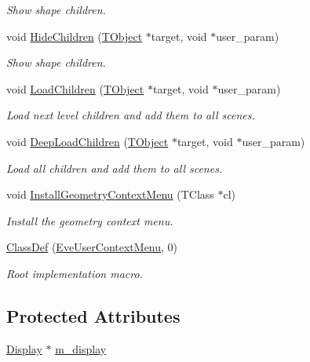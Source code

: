 \begin{DoxyCompactItemize}
\begin{DoxyCompactList}\small\item\em Show shape children. \end{DoxyCompactList}\item 
void \hyperlink{class_d_d4hep_1_1_eve_user_context_menu_a3dd44ef5d2c2a19002a584bb3aa0b10e}{Hide\+Children} (\hyperlink{class_t_object}{T\+Object} $\ast$target, void $\ast$user\+\_\+param)
\begin{DoxyCompactList}\small\item\em Show shape children. \end{DoxyCompactList}\item 
void \hyperlink{class_d_d4hep_1_1_eve_user_context_menu_a79e2490b2f169394ea18c19c3271e195}{Load\+Children} (\hyperlink{class_t_object}{T\+Object} $\ast$target, void $\ast$user\+\_\+param)
\begin{DoxyCompactList}\small\item\em Load next level children and add them to all scenes. \end{DoxyCompactList}\item 
void \hyperlink{class_d_d4hep_1_1_eve_user_context_menu_a10d91b40facd41a45d562d9667767884}{Deep\+Load\+Children} (\hyperlink{class_t_object}{T\+Object} $\ast$target, void $\ast$user\+\_\+param)
\begin{DoxyCompactList}\small\item\em Load all children and add them to all scenes. \end{DoxyCompactList}\item 
void \hyperlink{class_d_d4hep_1_1_eve_user_context_menu_a659b7acc26b0a8812cb688149d44a20d}{Install\+Geometry\+Context\+Menu} (T\+Class $\ast$cl)
\begin{DoxyCompactList}\small\item\em Install the geometry context menu. \end{DoxyCompactList}\item 
\hyperlink{class_d_d4hep_1_1_eve_user_context_menu_a05246cb30938d2a51dbb68468a3e8f8f}{Class\+Def} (\hyperlink{class_d_d4hep_1_1_eve_user_context_menu}{Eve\+User\+Context\+Menu}, 0)
\begin{DoxyCompactList}\small\item\em Root implementation macro. \end{DoxyCompactList}\end{DoxyCompactItemize}
\subsection*{Protected Attributes}
\begin{DoxyCompactItemize}
\item 
\hyperlink{class_d_d4hep_1_1_display}{Display} $\ast$ \hyperlink{class_d_d4hep_1_1_eve_user_context_menu_ab3592e822e14b2d25c4f68553df60cd0}{m\+\_\+display}
\end{DoxyCompactItemize}


